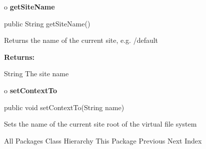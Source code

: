 o {\bf getSiteName} 

\begin{PRE}
 public String getSiteName()
\end{PRE}

\begin{description}
\htmlDD Returns the name of the current site, e.g. /default 

\begin{description}
\item {\bf Returns:}  

String The site name  
\end{description}

\end{description}

o {\bf setContextTo} 

\begin{PRE}
 public void setContextTo(String name)
\end{PRE}

\begin{description}
\htmlDD Sets the name of the current site root of the virtual file system 

\end{description}

\htmlHR

\begin{PRE}
All Packages  Class Hierarchy  This Package  Previous  Next  Index
\end{PRE}

